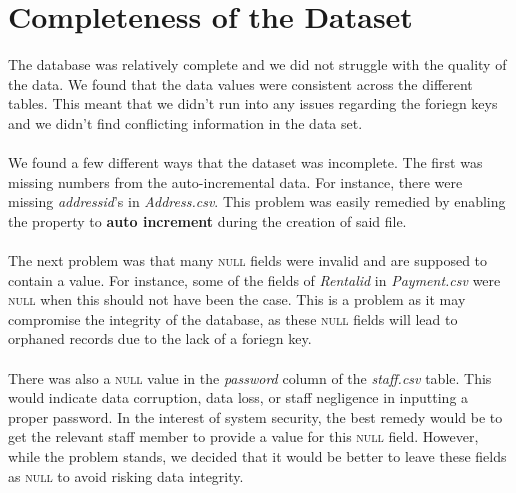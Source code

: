 \documentclass{article}
\begin{document}
\section{Completeness of the Dataset}
	The database was relatively complete and we did not struggle with the quality of the data. We found that the data values were consistent across the different tables. This meant
	 that we didn’t run into any issues regarding the foriegn keys and we didn’t find conflicting information in the data set.
	\\\\
	We found a few different ways that the dataset was incomplete. The first was missing numbers from the auto-incremental data. For instance,
	 there were missing \emph{address\textunderscore id}’s in \emph{Address.csv}. This problem was easily remedied by enabling the property to \textbf{auto increment} during the creation of said file. 
	\\\\
	The next problem was
	 that many \textsc{null} fields were invalid and are supposed to contain a value. 
	For instance, some of the fields of \emph{Rental\textunderscore id} in \emph{Payment.csv} were \textsc{null} when this should not have been the case. This is a problem as it 
	may compromise the integrity
	 of the database, as these \textsc{null} fields will lead to orphaned records due to the lack of a foriegn key.
	\\\\
	There was also a \textsc{null} value in the \emph{password} column of the \emph{staff.csv} table. This would indicate data corruption, data loss, or staff negligence in inputting a proper password. In the interest of system security, the best remedy would be to get the relevant staff member to provide a value for this \textsc{null} field. However, while the problem stands, we decided that it would be better to leave these fields as \textsc{null} to avoid risking data integrity.
\end{document}
